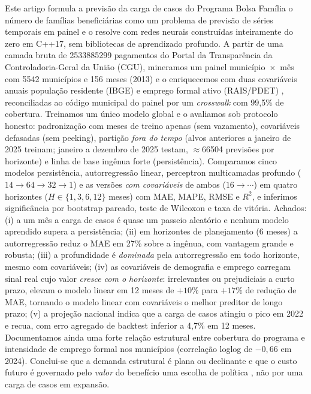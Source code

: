 \documentclass[12pt,a4paper,oneside]{article}
\begin{document}
\noindent
Este artigo formula a previsão da carga de casos do Programa Bolsa
Família \textemdash{} o número de famílias beneficiárias \textemdash{}
como um problema de previsão de séries temporais em painel e o resolve
com redes neurais construídas inteiramente do zero em C++17, sem
bibliotecas de aprendizado profundo. A partir de uma camada bruta de
\num{2533885299} pagamentos do Portal da Transparência da
Controladoria-Geral da União (CGU), mineramos um painel
município~$\times$~mês com \num{5542} municípios e 156 meses
(2013) e o enriquecemos com duas covariáveis anuais
\textemdash{} população residente (IBGE) e emprego formal ativo
(RAIS/PDET) \textemdash{}, reconciliadas ao código municipal do painel por
um \emph{crosswalk} com 99,5\% de cobertura. Treinamos um único modelo
global e o avaliamos sob protocolo honesto: padronização com meses de
treino apenas (sem vazamento), covariáveis defasadas (sem peeking),
partição \emph{fora do tempo} (alvos anteriores a janeiro de 2025
treinam; janeiro a dezembro de 2025 testam, $\approx$\num{66504} previsões
por horizonte) e linha de base ingênua forte (persistência). Comparamos
cinco modelos \textemdash{} persistência, autorregressão linear,
perceptron multicamadas profundo ($14\to 64\to 32\to 1$) e as versões
\emph{com covariáveis} de ambos ($16\to\cdots$) \textemdash{} em quatro
horizontes ($H\in\{1,3,6,12\}$ meses) com MAE, MAPE, RMSE e $R^2$, e
inferimos significância por bootstrap pareado, teste de Wilcoxon e taxa de
vitória. Achados: (i) a um mês a carga de casos é quase um passeio
aleatório e nenhum modelo aprendido supera a persistência; (ii) em
horizontes de planejamento (6 meses) a autorregressão reduz o MAE em
27\% sobre a ingênua, com vantagem grande e robusta; (iii) a profundidade
é \emph{dominada} pela autorregressão em todo horizonte, mesmo com
covariáveis; (iv) as covariáveis de demografia e emprego carregam sinal
real cujo valor \emph{cresce com o horizonte}: irrelevantes ou prejudiciais
a curto prazo, elevam o modelo linear em 12 meses de $+10\%$ para
$+17\%$ de redução de MAE, tornando o modelo linear com covariáveis o
melhor preditor de longo prazo; (v) a projeção nacional indica que a carga
de casos atingiu o pico em 2022 e recua, com erro agregado
de backtest inferior a 4,7\% em 12 meses. Documentamos ainda uma forte
relação estrutural entre cobertura do programa e intensidade de emprego
formal nos municípios (correlação log\-log de $-0{,}66$ em 2024).
Conclui-se que a demanda estrutural é plana ou declinante e que o custo
futuro é governado pelo \emph{valor} do benefício \textemdash{} uma
escolha de política \textemdash{}, não por uma carga de casos em expansão.
\end{document}
